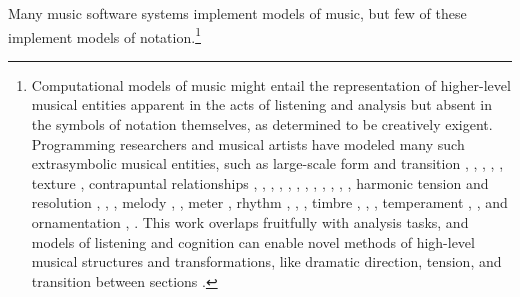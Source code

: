 \documentclass{article}
\begin{document}
Many music software systems implement models of music,
but few of these implement models of notation.\footnote{Computational
models of music might entail the representation of higher-level musical
entities apparent in the acts of listening and analysis but absent in the
symbols of notation themselves, as determined to be creatively exigent.
Programming researchers and musical artists have modeled many such
extrasymbolic musical entities, such as large-scale form and transition
\cite{polansky1991morphological}, \cite{uno1994temporal},
\cite{dobrian1995algorithmic}, \cite{abrams1999higher}, \cite{Yoo1983}, texture
\cite{Horenstein:2004kx}, contrapuntal relationships \cite{Boenn:2009oq},
\cite{Acevedo2005}, \cite{Anders:2011kl}, \cite{Balser:1990tg},
\cite{Jones:2000hc}, \cite{uno1994temporal}, \cite{Bell:1995ij},
\cite{farbood2001analysis}, \cite{Cope:2002fv}, \cite{Laurson:2005dz},
\cite{Polansky:2011fu}, \cite{Ebcioglu:1980kl}, harmonic tension and resolution
\cite{Melo2003}, \cite{Wiggins1999}, \cite{Foster:1995qa}, melody
\cite{Hornel:1993mi}, \cite{Smith:1992pi}, meter \cite{Hamanaka:2005ff}, rhythm
\cite{Nauert2007}, \cite{Degazio:1996lh}, \cite{Collins:2003bs}, timbre
\cite{Xenakis:1991fu}, \cite{Creasey:1996ye}, \cite{Osaka2004}, temperament
\cite{Seymour:2007qo}, \cite{Graf:2006il}, and ornamentation
\cite{Ariza:2003zt}, \cite{Chico-Topfer:1998jl}. This work overlaps fruitfully
with analysis tasks, and models of listening and cognition can enable novel
methods of high-level musical structures and transformations, like dramatic
direction, tension, and transition between sections \cite[108]{Collins2009}.} 
\end{document}
